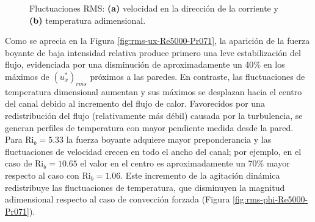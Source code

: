 \begin{figure}[H]
  \centering
  
    \caption{Fluctuaciones RMS: \textbf{(a)} velocidad en la dirección de la corriente y \textbf{(b)} temperatura adimensional.}
    \label{fig:rms-Re5000-Pr071}
\end{figure}

Como se aprecia en la Figura \ref{fig:rms-ux-Re5000-Pr071}, la aparición de la fuerza boyante de baja intensidad relativa produce primero una leve estabilización del flujo, evidenciada por una disminución de aproximadamente un 40$\%$ en los máximos de $(u^*_x)_{rms}$ próximos a las paredes. En contraste, las fluctuaciones de temperatura dimensional aumentan y sus máximos se desplazan hacia el centro del canal debido al incremento del flujo de calor. Favorecidos por una redistribución del flujo (relativamente más débil) causada por la turbulencia, se generan perfiles de temperatura con mayor pendiente medida desde la pared. Para $\text{Ri}_b=5\text{.}33$ la fuerza boyante adquiere mayor preponderancia y las fluctuaciones de velocidad crecen en todo el ancho del canal; por ejemplo, en el caso de $\text{Ri}_b=10\text{.}65$ el valor en el centro es aproximadamente un 70$\%$ mayor respecto al caso con $\text{Ri}_b=1\text{.}06$. Este incremento de la agitación dinámica redistribuye las fluctuaciones de temperatura, que disminuyen la magnitud adimensional respecto al caso de convección forzada (Figura \ref{fig:rms-phi-Re5000-Pr071}).

